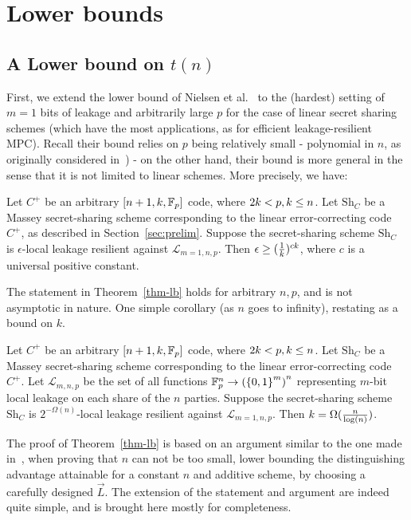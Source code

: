 \chapter{Lower bounds}
\label{sec:lower-bounds}

\section{A Lower bound on $t(n)$}

First, we extend the lower bound of Nielsen et al.~\cite{NS20} to the (hardest) setting of 
$m=1$ bits of leakage and arbitrarily large $p$ for the case of linear secret sharing schemes (which have the most applications, as for efficient leakage-resilient MPC). Recall their bound relies on $p$ being relatively small - polynomial in $n$, as originally considered in~\cite{EPRINT:BDIR19}) - on the other hand, their bound is more general in the sense that it is not limited to linear schemes.
More precisely, we have:
\begin{theorem}\label{thm-lb}
Let $C^+$  be an arbitrary $[n+1,k,\mathbb{F}_p]$ code, where $2k< p, k\leq n$. Let $\mathrm{Sh}_C$ be a Massey secret-sharing scheme corresponding to the linear error-correcting code $C^+$, as described in Section~\ref{sec:prelim}. 
Suppose the secret-sharing scheme $\mathrm{Sh}_C$ is $\epsilon$-local leakage resilient against ${\mathcal L}_{m=1,n,p}$.
Then $\epsilon\geq (\frac{1}{k})^{ck}$, where $c$ is a universal positive constant.
\end{theorem}

The statement in Theorem~\ref{thm-lb} holds for arbitrary $n,p$, and is not asymptotic in nature.
One simple corollary (as $n$ goes to infinity), restating as a bound on $k$.

\begin{corollary}
Let $C^+$  be an arbitrary $[n+1,k,\mathbb{F}_p]$ code, where $2k< p, k\leq n$. Let $\mathrm{Sh}_C$ be a Massey secret-sharing scheme corresponding to the linear error-correcting code $C^+$.
Let ${\mathcal L}_{m,n,p}$ be the set of all functions $\mathbb{F}^n_p\to \left({\{0,1\}}^m\right)^n$ representing $m$-bit local leakage on each share of the $n$ parties.
Suppose the secret-sharing scheme $\mathrm{Sh}_C$ is $2^{-\Omega(n)}$-local leakage resilient against ${\mathcal L}_{m=1,n,p}$. 
Then $k=\Omega(\frac{n}{\log(n)})$.
\end{corollary}
The proof of Theorem~\ref{thm-lb} is based on an argument similar to the one made in~\cite{EPRINT:BDIR19}, when proving that $n$ can not be too small, lower bounding the distinguishing advantage attainable for a constant $n$ and additive scheme, by choosing a carefully designed $\vec{L}$.
The extension of the statement and argument are indeed quite simple, and is brought here mostly for completeness.

